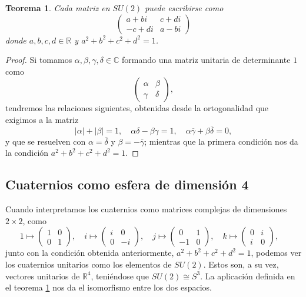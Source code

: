 \documentclass{article}
\theoremstyle{plain}
\newtheorem{theorem}{Teorema}
\theoremstyle{definition}
\theoremstyle{remark}
\begin{document}
\begin{theorem}\label{su2}
  Cada matriz en $SU(2)$ puede escribirse como
  \[\begin{pmatrix}
      a+bi & c+di \\
      -c+di & a-bi
    \end{pmatrix}\]
  donde $a,b,c,d \in \mathbb{R}$ y $a^2+b^2+c^2+d^2 = 1$.
\end{theorem}
\begin{proof}
  Si tomamos $\alpha,\beta,\gamma,\delta \in \mathbb{C}$ formando una matriz unitaria de
  determinante $1$ como
    \[\begin{pmatrix}
      \alpha & \beta \\
      \gamma & \delta
    \end{pmatrix},\]
  tendremos las relaciones siguientes, obtenidas desde la ortogonalidad que exigimos a la matriz
  \[|\alpha|+|\beta| = 1,
    \quad
    \alpha\delta-\beta\gamma = 1,
    \quad
    \alpha\overline{\gamma} + \beta\overline{\delta} = 0,
  \]
  y que se resuelven con $\alpha = \overline{\delta}$ y
  $\beta = -\overline{\gamma}$; mientras que la primera condición
  nos da la condición $a^2+b^2+c^2+d^2 = 1$.
\end{proof}


\subsection{Cuaternios como esfera de dimensión 4}
Cuando interpretamos los cuaternios como matrices complejas de dimensiones
$2 \times 2$, como
\[
  1 \mapsto \begin{pmatrix} 1 & 0 \\ 0 & 1 \end{pmatrix},\quad
  i \mapsto \begin{pmatrix} i & 0 \\ 0 &-i \end{pmatrix},\quad
  j \mapsto \begin{pmatrix} 0 & 1 \\-1 & 0 \end{pmatrix},\quad
  k \mapsto \begin{pmatrix} 0 & i \\ i & 0 \end{pmatrix},\quad
\]
junto con la condición obtenida anteriormente, $a^2+b^2+c^2+d^2 = 1$,
podemos ver los cuaternios unitarios como los elementos de $SU(2)$.
Estos son, a su vez, vectores unitarios de $\mathbb{R}^4$, teniéndose
que $SU(2) \cong S^3$. La aplicación definida
en el teorema \ref{su2} nos da el isomorfismo entre los dos espacios. 
\end{document}
